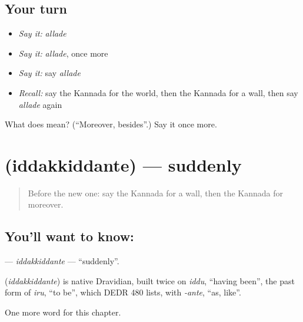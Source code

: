 \subsection*{Your turn}
\begin{itemize}
\raggedright
  \item \emph{Say it:} \emph{allade}
  \item \emph{Say it:} \emph{allade}, once more
  \item \emph{Say it:} say \emph{allade}
  \item \emph{Recall:} say the Kannada for the world, then the Kannada for a wall, then say \emph{allade} again
\end{itemize}

\begin{tcolorbox}[breakable,colback=teal!4,colframe=teal!35!black,title={Before you move on}]
What does  mean? (\textquotedblleft{}Moreover, besides\textquotedblright{}.) Say it once more.
\end{tcolorbox}
\section[\texorpdfstring{\kn{ಇದ್ದಕ್ಕಿದ್ದಂತೆ} (iddakkiddante)}{ಇದ್ದಕ್ಕಿದ್ದಂತೆ (iddakkiddante)}]{ (iddakkiddante) — suddenly}

\label{lesson:KA-C288-iddakkiddante}



\begin{quote}
Before the new one: say the Kannada for a wall, then the Kannada for moreover.
\end{quote}

\subsection*{You'll want to know: }
\textbf{} — \emph{iddakkiddante} — \textquotedblleft{}suddenly\textquotedblright{}.

\begin{cousinweb}
\textbf{} (\emph{iddakkiddante}) is native Dravidian, built twice on \emph{iddu}, \textquotedblleft{}having been\textquotedblright{}, the past form of \emph{iru}, \textquotedblleft{}to be\textquotedblright{}, which DEDR 480 lists, with \emph{-ante}, \textquotedblleft{}as, like\textquotedblright{}.
\end{cousinweb}

\begin{grammarlens}[title={What you've built}]
One more word for this chapter.
\end{grammarlens}

